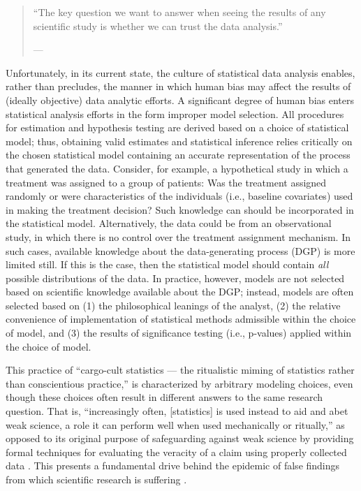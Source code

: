 \documentclass[
  12pt, krantz2,
]{krantz}
\newcommand{\1}{\mathbbm{1}}
\theoremstyle{definition}
\theoremstyle{definition}
\theoremstyle{definition}
\theoremstyle{definition}
\theoremstyle{remark}
\begin{document}
\begin{quote}
``The key question we want to answer when seeing the results of any scientific
study is whether we can trust the data analysis.''

--- \citet{peng2015reproducibility}
\end{quote}

Unfortunately, in its current state, the culture of statistical data analysis
enables, rather than precludes, the manner in which human bias may affect the
results of (ideally objective) data analytic efforts. A significant degree of
human bias enters statistical analysis efforts in the form improper model
selection. All procedures for estimation and hypothesis testing are derived
based on a choice of statistical model; thus, obtaining valid estimates and
statistical inference relies critically on the chosen statistical model
containing an accurate representation of the process that generated the data.
Consider, for example, a hypothetical study in which a treatment was assigned to
a group of patients: Was the treatment assigned randomly or were characteristics
of the individuals (i.e., baseline covariates) used in making the treatment
decision? Such knowledge can should be incorporated in the statistical model.
Alternatively, the data could be from an observational study, in which there is
no control over the treatment assignment mechanism. In such cases, available
knowledge about the data-generating process (DGP) is more limited still. If
this is the case, then the statistical model should contain \emph{all} possible
distributions of the data. In practice, however, models are not selected based
on scientific knowledge available about the DGP; instead, models are often
selected based on (1) the philosophical leanings of the analyst, (2) the
relative convenience of implementation of statistical methods admissible within
the choice of model, and (3) the results of significance testing (i.e.,
p-values) applied within the choice of model.

This practice of ``cargo-cult statistics --- the ritualistic miming of statistics
rather than conscientious practice,'' \citep{stark2018cargo} is characterized by
arbitrary modeling choices, even though these choices often result in different
answers to the same research question. That is, ``increasingly often,
{[}statistics{]} is used instead to aid and abet weak science, a role it can perform
well when used mechanically or ritually,'' as opposed to its original purpose of
safeguarding against weak science by providing formal techniques for evaluating
the veracity of a claim using properly collected data \citep{stark2018cargo}. This
presents a fundamental drive behind the epidemic of false findings from which
scientific research is suffering \citep{vdl2014entering}.
\end{document}
